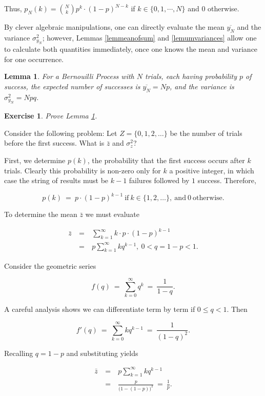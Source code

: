 \documentclass[12pt,letterpaper]{report}
\newcommand\be{\begin{equation}}
\newcommand\ee{\end{equation}}
\newcommand\bea{\begin{eqnarray}}
\newcommand\eea{\end{eqnarray}}
\newtheorem{lem}[thm]{Lemma}
\newtheorem{exe}[thm]{Exercise}
\begin{document}
Thus, $p_N(k) = {N \choose k} p^k \cdot (1-p)^{N-k}$ if $k \in
\{0,1,\cdots, N\}$ and $0$ otherwise.

By clever algebraic manipulations, one can directly evaluate the
mean $\overline{y_N}$ and the variance $\sigma^2_{y_N}$; however,
Lemmas \ref{lemmeanofsum} and \ref{lemumvariances} allow one to
calculate both quantities immediately, once one knows the mean and
variance for one occurrence.

\begin{lem}\label{lembernoulli} For a Bernouilli Process with $N$
trials, each having probability $p$ of success, the expected
number of successes is $\overline{y_N} = Np$, and the variance is
$\sigma^2_{y_N} = Npq$.
\end{lem}

\begin{exe} Prove Lemma \ref{lembernoulli}. \end{exe}

Consider the following problem: Let $Z = \{0, 1, 2, \dots \}$ be
the number of trials before the first success. What is $\bar{z}$
and $\sigma^2_z$?

First, we determine $p(k)$, the probability that the first success
occurs after $k$ trials. Clearly this probability is non-zero only
for $k$ a positive integer, in which case the string of results
must be $k-1$ failures followed by $1$ success. Therefore,

\be p(k) \ = \ p \cdot (1-p)^{k-1} \ \mbox{if} \ k \in
\{1,2,\dots\}, \ \mbox{and} \ 0 \ \mbox{otherwise}. \ee

To determine the mean $\bar{z}$ we must evaluate

\bea \bar{z} & \ = \ & \sum_{k=1}^\infty k \cdot  p \cdot
(1-p)^{k-1} \nonumber\\ & \ = \ & p \sum_{k=1}^\infty k q^{k-1}, \
0 < q = 1-p < 1. \eea

Consider the geometric series

\be f(q) \ = \ \sum_{k=0}^\infty q^k\ = \ \frac{1}{1-q}. \ee

A careful analysis shows we can differentiate term by term if $0
\le q < 1$. Then

\be f'(q) \ = \ \sum_{k=0}^\infty k q^{k-1} \ = \
\frac{1}{(1-q)^2}. \ee

Recalling $q = 1-p$ and substituting yields

\bea \bar{z} & \ = \ & p \sum_{k=1}^\infty k q^{k-1} \nonumber\\ &
\ = \ & \frac{p}{\Big(1 - (1-p)\Big)^2} \ = \ \frac{1}{p}. \eea
\end{document}
